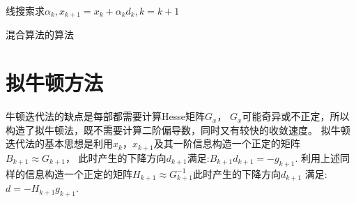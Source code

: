             
            
            
            
            
            
            
        \begin{algorithm}
        
            \SetAlgoLined
             {
                线搜索求$\alpha_k,x_{k+1}=x_k+\alpha_kd_k,k=k+1$
            }
            \caption{混合算法的算法}
        \end{algorithm}
            
    \section{拟牛顿方法}
        牛顿迭代法的缺点是每部都需要计算Hesse矩阵$G_x$，
        $G_x$可能奇异或不正定，所以构造了拟牛顿法，既不需要计算二阶偏导数，同时又有较快的收敛速度。
        拟牛顿迭代法的基本思想是利用$x_k$，$x_{k+1}$及其一阶信息构造一个正定的矩阵$B_{k+1}\approx G_{k+1}$，
        此时产生的下降方向$d_{k+1}$满足:$B_{k+1}d_{k+1}=-g_{k+1}$.
        利用上述同样的信息构造一个正定的矩阵$H_{k+1}\approx G_{k+1}^{-1}$此时产生的下降方向$d_{k+1}$
        满足:$d=-H_{k+1}g_{k+1}$.
        
